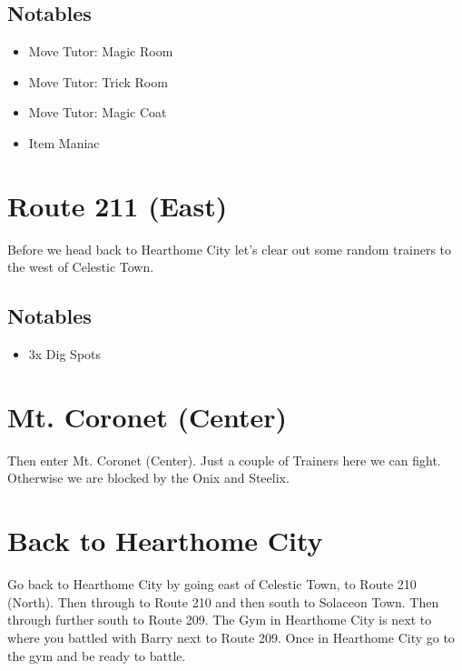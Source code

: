 \documentclass[11pt]{article}
\begin{document}
\subsection{Notables}\label{subsec:notables-celestic}

\begin{itemize}
    \item Move Tutor: Magic Room
    \item Move Tutor: Trick Room
    \item Move Tutor: Magic Coat
    \item Item Maniac
\end{itemize}

\section{Route 211 (East)}\label{sec:Route_211_(East)}
Before we head back to Hearthome City let's clear out some random trainers to
the west of Celestic Town.

\subsection{Notables}\label{subsec:notables-route-211-east}

\begin{itemize}
    \item 3x Dig Spots
\end{itemize}

\section{Mt. Coronet (Center)}

Then enter Mt. Coronet (Center).
Just a couple of Trainers here we can fight.
Otherwise we are blocked by the Onix and Steelix.



\section{Back to Hearthome City}\label{sec:back-to-hearthome-city}
Go back to Hearthome City by going east of Celestic Town, to Route 210 (North).
Then through to Route 210 and then south to Solaceon Town.
Then through further south to Route 209.
The Gym in Hearthome City is next to where you battled with Barry next to Route 209.
Once in Hearthome City go to the gym and be ready to battle.
\end{document}
